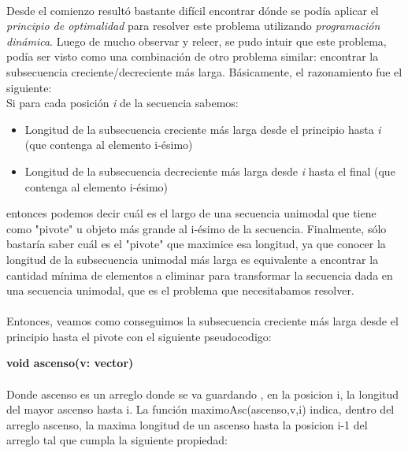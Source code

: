 \paragraph{}
Desde el comienzo resultó bastante difícil encontrar dónde se podía aplicar el \textit{principio de optimalidad} para resolver este problema utilizando \textit{programación dinámica}. Luego de mucho observar y releer, se pudo intuir que este problema, podía ser visto como una combinación de otro problema similar: encontrar la subsecuencia creciente/decreciente más larga. Básicamente, el razonamiento fue el siguiente:\\
Si para cada posición \textit{i} de la secuencia sabemos:
\begin{itemize}
	\item Longitud de la subsecuencia creciente más larga desde el principio hasta \textit{i} (que contenga al elemento i-ésimo)
	\item Longitud de la subsecuencia decreciente más larga desde \textit{i} hasta el final (que contenga al elemento i-ésimo)
\end{itemize}
entonces podemos decir cuál es el largo de una secuencia unimodal que tiene como "pivote" u objeto más grande al i-ésimo de la secuencia. Finalmente, sólo bastaría saber cuál es el "pivote" que maximice esa longitud, ya que conocer la longitud de la subsecuencia unimodal más larga es equivalente a encontrar la cantidad mínima de elementos a eliminar para transformar la secuencia dada en una secuencia unimodal, que es el problema que necesitabamos resolver.

\paragraph{}
Entonces, veamos como conseguimos la subsecuencia creciente más larga desde el principio hasta el pivote con el siguiente pseudocodigo:






\textbf{void ascenso(v: vector)}\\
	\begin{algorithm}[H]

  \end{algorithm}


\paragraph{}
Donde ascenso es un arreglo donde se va guardando , en la posicion i, la longitud del mayor ascenso hasta i. La función maximoAsc(ascenso,v,i) indica, dentro del arreglo ascenso, la maxima longitud de un ascenso hasta la posicion i-1 del arreglo tal que cumpla la siguiente propiedad:


